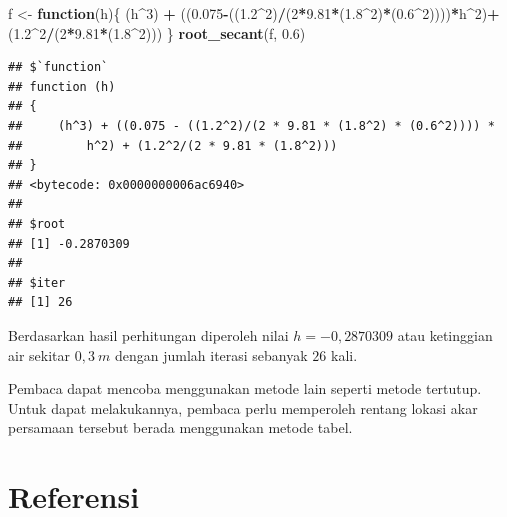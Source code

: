 \documentclass[]{book}
\newenvironment{Shaded}{\begin{snugshade}}{\end{snugshade}}
\newcommand{\ControlFlowTok}[1]{\textcolor[rgb]{0.13,0.29,0.53}{\textbf{#1}}}
\newcommand{\DecValTok}[1]{\textcolor[rgb]{0.00,0.00,0.81}{#1}}
\newcommand{\FloatTok}[1]{\textcolor[rgb]{0.00,0.00,0.81}{#1}}
\newcommand{\KeywordTok}[1]{\textcolor[rgb]{0.13,0.29,0.53}{\textbf{#1}}}
\newcommand{\NormalTok}[1]{#1}
\newcommand{\OperatorTok}[1]{\textcolor[rgb]{0.81,0.36,0.00}{\textbf{#1}}}
\newcommand{\StringTok}[1]{\textcolor[rgb]{0.31,0.60,0.02}{#1}}
\theoremstyle{definition}
\theoremstyle{definition}
\theoremstyle{definition}
\theoremstyle{remark}
\begin{document}
\begin{Shaded}
\begin{Highlighting}[]
\NormalTok{f <-}\StringTok{ }\ControlFlowTok{function}\NormalTok{(h)\{}
\NormalTok{  (h}\OperatorTok{^}\DecValTok{3}\NormalTok{) }\OperatorTok{+}\StringTok{ }\NormalTok{((}\FloatTok{0.075}\OperatorTok{-}\NormalTok{((}\FloatTok{1.2}\OperatorTok{^}\DecValTok{2}\NormalTok{)}\OperatorTok{/}\NormalTok{(}\DecValTok{2}\OperatorTok{*}\FloatTok{9.81}\OperatorTok{*}\NormalTok{(}\FloatTok{1.8}\OperatorTok{^}\DecValTok{2}\NormalTok{)}\OperatorTok{*}\NormalTok{(}\FloatTok{0.6}\OperatorTok{^}\DecValTok{2}\NormalTok{))))}\OperatorTok{*}\NormalTok{h}\OperatorTok{^}\DecValTok{2}\NormalTok{)}\OperatorTok{+}\StringTok{ }\NormalTok{(}\FloatTok{1.2}\OperatorTok{^}\DecValTok{2}\OperatorTok{/}\NormalTok{(}\DecValTok{2}\OperatorTok{*}\FloatTok{9.81}\OperatorTok{*}\NormalTok{(}\FloatTok{1.8}\OperatorTok{^}\DecValTok{2}\NormalTok{)))}
\NormalTok{\}}
\KeywordTok{root_secant}\NormalTok{(f, }\FloatTok{0.6}\NormalTok{)}
\end{Highlighting}
\end{Shaded}

\begin{verbatim}
## $`function`
## function (h) 
## {
##     (h^3) + ((0.075 - ((1.2^2)/(2 * 9.81 * (1.8^2) * (0.6^2)))) * 
##         h^2) + (1.2^2/(2 * 9.81 * (1.8^2)))
## }
## <bytecode: 0x0000000006ac6940>
## 
## $root
## [1] -0.2870309
## 
## $iter
## [1] 26
\end{verbatim}

Berdasarkan hasil perhitungan diperoleh nilai \(h=-0,2870309\) atau ketinggian air sekitar \(0,3\ m\) dengan jumlah iterasi sebanyak \(26\) kali.

Pembaca dapat mencoba menggunakan metode lain seperti metode tertutup. Untuk dapat melakukannya, pembaca perlu memperoleh rentang lokasi akar persamaan tersebut berada menggunakan metode tabel.

\hypertarget{referensi-6}{%
\section{Referensi}\label{referensi-6}}
\end{document}
